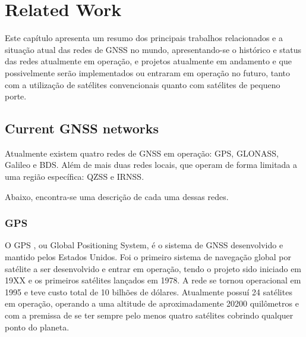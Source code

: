 %
%
%
%
%

%
%
%
%
%


\chapter{Related Work} \label{ch:related-work}

Este capítulo apresenta um resumo dos principais trabalhos relacionados e a situação atual das redes de GNSS no mundo, apresentando-se o histórico e status das redes atualmente em operação, e projetos atualmente em andamento e que possivelmente serão implementados ou entraram em operação no futuro, tanto com a utilização de satélites convencionais quanto com satélites de pequeno porte.

\section{Current GNSS networks}

Atualmente existem quatro redes de GNSS em operação: GPS, GLONASS, Galileo e BDS. Além de mais duas redes locais, que operam de forma limitada a uma região específica: QZSS e IRNSS.

Abaixo, encontra-se uma descrição de cada uma dessas redes.

\subsection{GPS}

O GPS \cite{gps}, ou Global Positioning System, é o sistema de GNSS desenvolvido e mantido pelos Estados Unidos. Foi o primeiro sistema de navegação global por satélite a ser desenvolvido e entrar em operação, tendo o projeto sido iniciado em 19XX e os primeiros satélites lançados em 1978. A rede se tornou operacional em 1995 e teve custo total de 10 bilhões de dólares. Atualmente possuí 24 satélites em operação, operando a uma altitude de aproximadamente 20200 quilômetros e com a premissa de se ter sempre pelo menos quatro satélites cobrindo qualquer ponto do planeta.

